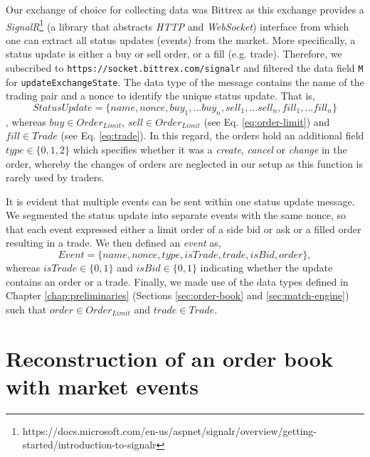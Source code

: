 Our exchange of choice for collecting data was Bittrex as this exchange provides a \textit{SignalR}\footnote{https://docs.microsoft.com/en-us/aspnet/signalr/overview/getting-started/introduction-to-signalr} (a library that abstracts \textit{HTTP} and \textit{WebSocket}) interface from which one can extract all status updates (events) from the market.
More specifically, a status update is either a buy or sell order, or a fill (e.g. trade).
Therefore, we subscribed to \texttt{https://socket.bittrex.com/signalr} and filtered the data field \texttt{M} for \texttt{updateExchangeState}.
The data type of the message contains the name of the trading pair and a nonce to identify the unique status update.
That is,
\begin{equation}
    StatusUpdate = \{name, nonce, buy_1,...buy_n, sell_1,...sell_n, fill_1,...fill_n\}
\end{equation}
, whereas $buy \in Order_{Limit}$, $sell \in Order_{Limit}$ (see Eq. \ref{eq:order-limit}) and $fill \in Trade$ (see Eq. \ref{eq:trade}).
In this regard, the orders hold an additional field $type \in \{0,1,2\}$ which specifies whether it was a \textit{create}, \textit{cancel} or \textit{change} in the order, whereby the changes of orders are neglected in our setup as this function is rarely used by traders.

It is evident that multiple events can be sent within one status update message. 
We segmented the status update into separate events with the same nonce, so that each event expressed either a limit order of a side bid or ask or a filled order resulting in a trade.
We then defined an \textit{event} as,
\begin{equation}\label{eq:event-update}
    Event = \{name, nonce, type, isTrade, trade, isBid, order\},
\end{equation}
whereas $isTrade \in \{0,1\}$ and $isBid \in \{0,1\}$ indicating whether the update contains an order or a trade. 
Finally, we made use of the data types defined in Chapter \ref{chap:preliminaries} (Sections \ref{sec:order-book} and \ref{sec:match-engine}) such that $order \in Order_{Limit}$ and $trade \in Trade$.

\section{Reconstruction of an order book with market events}
\label{sec:data-generation}

